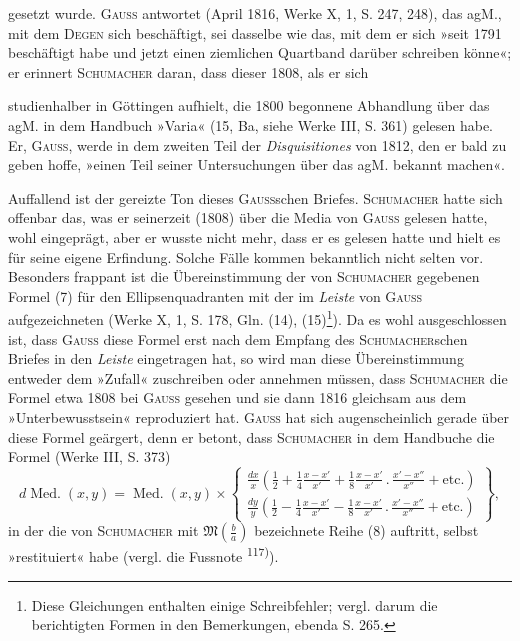 \endgroup
\noindent gesetzt wurde. \textsc{Gauss} antwortet (April 1816, Werke X, 1, S. 247, 248), das
agM., mit dem \textsc{Degen} sich beschäftigt, sei dasselbe wie das, mit dem er sich
»seit 1791 beschäftigt habe und jetzt einen ziemlichen Quartband darüber
schreiben könne«; er erinnert \textsc{Schumacher} daran, dass dieser 1808, als er sich
\par\clearpage{}
\noindent studienhalber in Göttingen aufhielt, die 1800 begonnene Abhandlung über
das agM. in dem Handbuch »Varia« (15, Ba, siehe Werke III, S. 361) gelesen
habe. Er, \textsc{Gauss}, werde in dem zweiten Teil der \textit{Disquisitiones} von 1812,
den er bald zu geben hoffe, »einen Teil seiner Untersuchungen über das agM.
bekannt machen«.

Auffallend ist der gereizte Ton dieses \textsc{Gauss}schen Briefes. \textsc{Schumacher}
hatte sich offenbar das, was er seinerzeit (1808) über die Media von \textsc{Gauss}
gelesen hatte, wohl eingeprägt, aber er wusste nicht mehr, dass er es gelesen
hatte und hielt es für seine eigene Erfindung. Solche Fälle kommen bekanntlich
nicht selten vor. Besonders frappant ist die  Übereinstimmung
der von \textsc{Schumacher} gegebenen Formel (7) für den Ellipsenquadranten
mit der im \textit{Leiste} von \textsc{Gauss} aufgezeichneten (Werke X, 1, S. 178,
Gln. (14), (15)\footnote{Diese Gleichungen enthalten einige Schreibfehler; vergl. darum die berichtigten Formen in den Bemerkungen, ebenda S. 265.}). Da es wohl ausgeschlossen ist, dass \textsc{Gauss} diese Formel erst
nach dem Empfang des \textsc{Schumacher}schen Briefes in den \textit{Leiste} eingetragen
hat, so wird man diese Übereinstimmung entweder dem »Zufall« zuschreiben
oder annehmen müssen, dass \textsc{Schumacher} die Formel etwa 1808 bei \textsc{Gauss}
gesehen und sie dann 1816 gleichsam aus dem »Unterbewusstsein« reproduziert
hat. \textsc{Gauss} hat sich augenscheinlich gerade über diese Formel geärgert, denn
er betont, dass \textsc{Schumacher} in dem Handbuche die Formel (Werke III, S. 373)
\begingroup\makeatletter\tagsleft@true\let\veqno\leqno\makeatother
\begin{equation*}
d\operatorname{Med.}(x,y)=\operatorname{Med.}(x,y)\times
\left\{\begin{gathered}
\frac{dx}{x}\left(\frac12+\frac14\frac{x-x'}{x'}+\frac18\frac{x-x'}{x'}\mathbin{.}\frac{x'-x''}{x''}+\mathrm{etc.}\right)\\
\frac{dy}{y}\left(\frac12-\frac14\frac{x-x'}{x'}-\frac18\frac{x-x'}{x'}\mathbin{.}\frac{x'-x''}{x''}+\mathrm{etc.}\right)
\end{gathered}\right\},\tag{9}
\end{equation*}
\endgroup
\noindent in der die von \textsc{Schumacher} mit \(\mathfrak{M}\left(\frac ba\right)\) bezeichnete Reihe (8) auftritt, selbst
»restituiert« habe (vergl. die Fussnote \textsuperscript{117)}).

